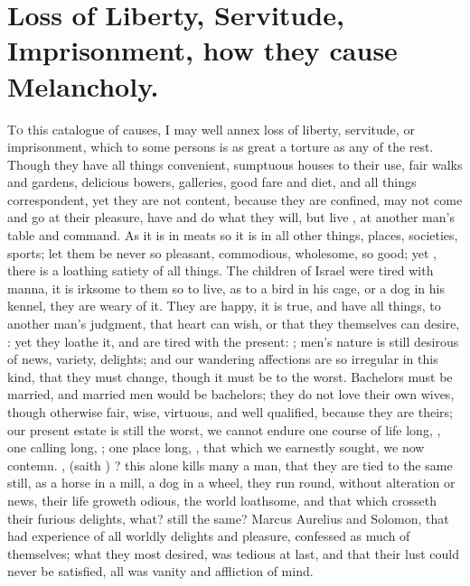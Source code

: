 \section[Loss of Liberty, Servitude]{Loss of Liberty, Servitude, Imprisonment,
how they cause Melancholy.}

\lettrine{T}{o} this catalogue of causes, I may well annex loss of liberty,
servitude, or imprisonment, which to some persons is as great a torture as any
of the rest. Though they have all things convenient, sumptuous houses to their
use, fair walks and gardens, delicious bowers, galleries, good fare and diet,
and all things correspondent, yet they are not content, because they are
confined, may not come and go at their pleasure, have and do what they will,
but live , at another man's table and
command. As it is in meats so it is in all other things,
places, societies, sports; let them be never so pleasant, commodious,
wholesome, so good; yet , there is a loathing
satiety of all things. The children of Israel were tired with manna, it is
irksome to them so to live, as to a bird in his cage, or a dog in his kennel,
they are weary of it. They are happy, it is true, and have all things, to
another man's judgment, that heart can wish, or that they themselves can
desire, : yet they loathe it, and are tired with the
present: ; men's nature is still
desirous of news, variety, delights; and our wandering affections are so
irregular in this kind, that they must change, though it must be to the worst.
Bachelors must be married, and married men would be bachelors; they do not love
their own wives, though otherwise fair, wise, virtuous, and well qualified,
because they are theirs; our present estate is still the worst, we cannot
endure one course of life long, , one calling
long, ; one place long,
, that which we
earnestly sought, we now contemn. , (saith
\Seneca{}) ? this
alone kills many a man, that they are tied to the same still, as a horse in a
mill, a dog in a wheel, they run round, without alteration or news, their life
groweth odious, the world loathsome, and that which crosseth their furious
delights, what? still the same? Marcus Aurelius and Solomon, that had
experience of all worldly delights and pleasure, confessed as much of
themselves; what they most desired, was tedious at last, and that their lust
could never be satisfied, all was vanity and affliction of mind.

